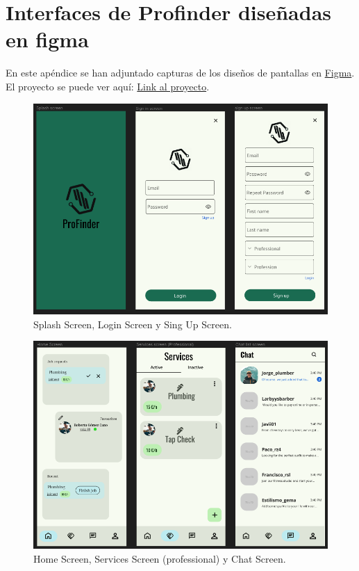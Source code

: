 \chapter{Interfaces de Profinder diseñadas en figma}
\label{Appendix:interfacesfigma}
En este apéndice se han adjuntado capturas de los diseños de pantallas en \hyperlink{subsec:figma}{Figma}. El proyecto se puede ver aquí: \href{https://www.figma.com/file/RczHTTSY0EkrdOnrnHMPWb/Profinder?type=design&node-id=0%3A1&mode=design&t=BnrHPXS7PUtcqHPP-1}{Link al proyecto}.
\begin{figure}[h]
	\centering
	\includegraphics[width = 1\textwidth]{Imagenes/figma/figma1.png}
	\caption{Splash Screen, Login Screen y Sing Up Screen.}
	\label{fig:figma1}
\end{figure}
\begin{figure}[h]
	\centering
	\includegraphics[width = 1\textwidth]{Imagenes/figma/figma2.png}
	\caption{Home Screen, Services Screen (professional) y Chat Screen.}
	\label{fig:figma2}
\end{figure}

